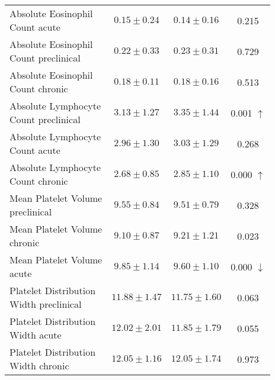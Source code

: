 \begin{table}[htbp]
\begin{tabular}{lccc}
\makecell[l]{Absolute Eosinophil \\ Count acute} & $0.15 \pm 0.24$ & $0.14 \pm 0.16$ & 0.215  \\

\makecell[l]{Absolute Eosinophil \\ Count preclinical} & $0.22 \pm 0.33$ & $0.23 \pm 0.31$ & 0.729  \\

\makecell[l]{Absolute Eosinophil \\ Count chronic} & $0.18 \pm 0.11$ & $0.18 \pm 0.16$ & 0.513  \\

\makecell[l]{Absolute Lymphocyte \\ Count preclinical} & $3.13 \pm 1.27$ & $3.35 \pm 1.44$ & 0.001 $\uparrow$ \\

\makecell[l]{Absolute Lymphocyte \\ Count acute} & $2.96 \pm 1.30$ & $3.03 \pm 1.29$ & 0.268  \\

\makecell[l]{Absolute Lymphocyte \\ Count chronic} & $2.68 \pm 0.85$ & $2.85 \pm 1.10$ & 0.000 $\uparrow$ \\

\makecell[l]{Mean Platelet Volume \\ preclinical} & $9.55 \pm 0.84$ & $9.51 \pm 0.79$ & 0.328  \\

\makecell[l]{Mean Platelet Volume \\ chronic} & $9.10 \pm 0.87$ & $9.21 \pm 1.21$ & 0.023  \\

\makecell[l]{Mean Platelet Volume \\ acute} & $9.85 \pm 1.14$ & $9.60 \pm 1.10$ & 0.000 $\downarrow$ \\

\makecell[l]{Platelet Distribution \\ Width preclinical} & $11.88 \pm 1.47$ & $11.75 \pm 1.60$ & 0.063  \\

\makecell[l]{Platelet Distribution \\ Width acute} & $12.02 \pm 2.01$ & $11.85 \pm 1.79$ & 0.055  \\

\makecell[l]{Platelet Distribution \\ Width chronic} & $12.05 \pm 1.16$ & $12.05 \pm 1.74$ & 0.973  \\


\end{tabular}
\end{table}
